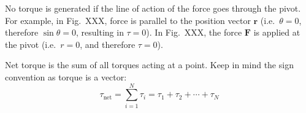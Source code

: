 %
%
%
No torque is generated if the line of action of the force goes through the
pivot. For example, in Fig.\ XXX, force is parallel to the position vector
$\bm r$ (i.e.\ $\theta=0$, therefore $\sin\theta=0$, resulting in $\tau=0$).
In Fig.\ XXX, the force $\bm F$ is applied at the pivot (i.e.\ $r=0$, and
therefore $\tau=0$).
\begin{figure}[ht]
  \centering
  \begin{subfigure}{.4\textwidth}
    \centering
  \end{subfigure}
  \begin{subfigure}{.4\textwidth}
    \centering
  \end{subfigure}
\end{figure}

Net torque is the sum of all torques acting at a point. Keep in mind the sign
convention as torque is a vector:
\begin{equation}
  \boxed{
    \tau_\text{net}=\sum_{i=1}^N\tau_i=\tau_1 + \tau_2 +\cdots + \tau_N
  }
\end{equation}


